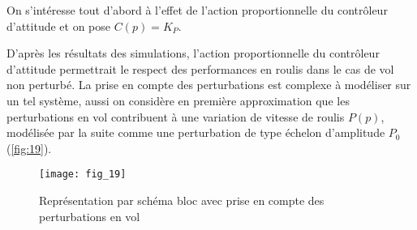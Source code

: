 \ifprof
\begin{corrige}
\end{corrige}
\else
\fi

On s’intéresse tout d’abord à l’effet de l’action proportionnelle du contrôleur d’attitude et on
pose $C(p) = K_P$.


\ifprof
\begin{corrige}
\end{corrige}
\else
\fi


D’après les résultats des simulations, l’action proportionnelle du contrôleur d’attitude permettrait le respect des performances en roulis dans le cas de vol non perturbé. La prise en
compte des perturbations est complexe à modéliser sur un tel système, aussi on considère
en première approximation que les perturbations en vol contribuent à une variation de vitesse
de roulis $P(p)$, modélisée par la suite comme une perturbation de type échelon d’amplitude $P_0$
(\autoref{fig:19}).

\begin{figure}[H]
\centering
\texttt{[image: fig\_19]}
\caption{\label{fig:19} Représentation par schéma bloc avec prise en compte des perturbations en vol}
\end{figure}


\ifprof
\begin{corrige}
\end{corrige}
\else
\fi

\ifprof
\begin{corrige}
\end{corrige}
\else
\fi

\ifprof
\begin{corrige}
\end{corrige}
\else
\fi

